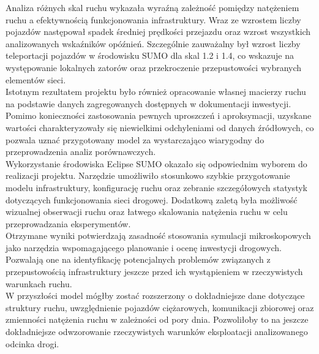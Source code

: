 \documentclass[polish]{projectreport}
\begin{document}
Analiza różnych skal ruchu wykazała wyraźną zależność pomiędzy natężeniem ruchu a efektywnością funkcjonowania infrastruktury. Wraz ze wzrostem liczby pojazdów następował spadek średniej prędkości przejazdu oraz wzrost wszystkich analizowanych wskaźników opóźnień. Szczególnie zauważalny był wzrost liczby teleportacji pojazdów w środowisku SUMO dla skal 1.2 i 1.4, co wskazuje na występowanie lokalnych zatorów oraz przekroczenie przepustowości wybranych elementów sieci. \\

Istotnym rezultatem projektu było również opracowanie własnej macierzy ruchu na podstawie danych zagregowanych dostępnych w dokumentacji inwestycji. Pomimo konieczności zastosowania pewnych uproszczeń i aproksymacji, uzyskane wartości charakteryzowały się niewielkimi odchyleniami od danych źródłowych, co pozwala uznać przygotowany model za wystarczająco wiarygodny do przeprowadzenia analiz porównawczych. \\

Wykorzystanie środowiska Eclipse SUMO okazało się odpowiednim wyborem do realizacji projektu. Narzędzie umożliwiło stosunkowo szybkie przygotowanie modelu infrastruktury, konfigurację ruchu oraz zebranie szczegółowych statystyk dotyczących funkcjonowania sieci drogowej. Dodatkową zaletą była możliwość wizualnej obserwacji ruchu oraz łatwego skalowania natężenia ruchu w celu przeprowadzania eksperymentów. \\

Otrzymane wyniki potwierdzają zasadność stosowania symulacji mikroskopowych jako narzędzia wspomagającego planowanie i ocenę inwestycji drogowych. Pozwalają one na identyfikację potencjalnych problemów związanych z przepustowością infrastruktury jeszcze przed ich wystąpieniem w rzeczywistych warunkach ruchu. \\

W przyszłości model mógłby zostać rozszerzony o dokładniejsze dane dotyczące struktury ruchu, uwzględnienie pojazdów ciężarowych, komunikacji zbiorowej oraz zmienności natężenia ruchu w zależności od pory dnia. Pozwoliłoby to na jeszcze dokładniejsze odwzorowanie rzeczywistych warunków eksploatacji analizowanego odcinka drogi. \\

\newpage
\printbibliography

\end{document}
